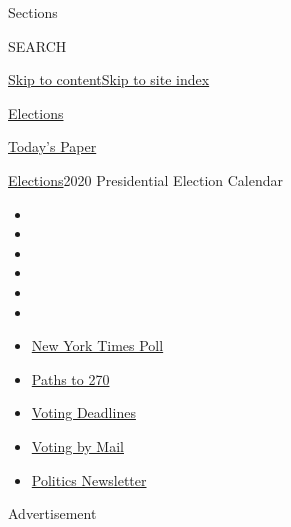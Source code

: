 Sections

SEARCH

\protect\hyperlink{site-content}{Skip to
content}\protect\hyperlink{site-index}{Skip to site index}

\href{https://www.nytimes3xbfgragh.onion/news-event/2020-election}{Elections}

\href{https://myaccount.nytimes3xbfgragh.onion/auth/login?response_type=cookie\&client_id=vi}{}

\href{https://www.nytimes3xbfgragh.onion/section/todayspaper}{Today's
Paper}

\href{/news-event/2020-election}{Elections}\textbar{}2020 Presidential
Election Calendar

\begin{itemize}
\item
\item
\item
\item
\item
\item
\end{itemize}

\begin{itemize}
\item
  \href{https://www.nytimes3xbfgragh.onion/2020/09/12/us/politics/biden-trump-poll-wisconsin-minnesota.html?action=click\&pgtype=Article\&state=default\&region=TOP_BANNER\&context=storylines_menu}{New
  York Times Poll}
\item
  \href{https://www.nytimes3xbfgragh.onion/interactive/2020/us/elections/election-states-biden-trump.html?action=click\&pgtype=Article\&state=default\&region=TOP_BANNER\&context=storylines_menu}{Paths
  to 270}
\item
  \href{https://www.nytimes3xbfgragh.onion/interactive/2019/us/elections/2020-presidential-election-calendar.html?action=click\&pgtype=Article\&state=default\&region=TOP_BANNER\&context=storylines_menu}{Voting
  Deadlines}
\item
  \href{https://www.nytimes3xbfgragh.onion/interactive/2020/08/31/us/politics/vote-by-mail-deadlines.html?action=click\&pgtype=Article\&state=default\&region=TOP_BANNER\&context=storylines_menu}{Voting
  by Mail}
\item
  \href{https://www.nytimes3xbfgragh.onion/newsletters/politics?action=click\&pgtype=Article\&state=default\&region=TOP_BANNER\&context=storylines_menu}{Politics
  Newsletter}
\end{itemize}

Advertisement

